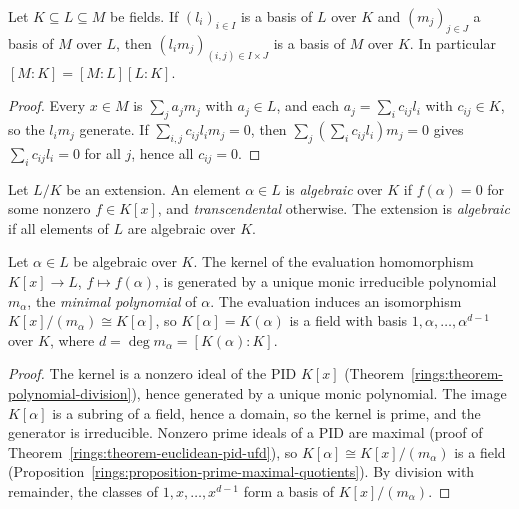 \begin{theorem}\label{fields:theorem-tower}
Let $K \subseteq L \subseteq M$ be fields. If $(l_i)_{i \in I}$ is a basis of $L$ over $K$ and $(m_j)_{j \in J}$ a
basis of $M$ over $L$, then $(l_i m_j)_{(i,j) \in I \times J}$ is a basis of $M$ over $K$. In
particular $[M : K] = [M : L][L : K]$.
\end{theorem}

\begin{proof}
Every $x \in M$ is $\sum_j a_j m_j$ with $a_j \in L$, and each $a_j = \sum_i c_{ij} l_i$ with
$c_{ij} \in K$, so the $l_i m_j$ generate. If $\sum_{i,j} c_{ij} l_i m_j = 0$, then
$\sum_j (\sum_i c_{ij} l_i) m_j = 0$ gives $\sum_i c_{ij} l_i = 0$ for all $j$, hence all $c_{ij} = 0$.
\end{proof}

\begin{definition}\label{fields:definition-algebraic}
Let $L/K$ be an extension. An element $\alpha \in L$ is \emph{algebraic} over $K$ if
$f(\alpha) = 0$ for some nonzero $f \in K[x]$, and \emph{transcendental} otherwise. The
extension is \emph{algebraic} if all elements of $L$ are algebraic over $K$.
\end{definition}

\begin{proposition}\label{fields:proposition-minimal-polynomial}
Let $\alpha \in L$ be algebraic over $K$. The kernel of the evaluation homomorphism
$K[x] \to L$, $f \mapsto f(\alpha)$, is generated by a unique monic irreducible polynomial
$m_\alpha$, the \emph{minimal polynomial} of $\alpha$. The evaluation induces an isomorphism
$K[x]/(m_\alpha) \cong K[\alpha]$, so $K[\alpha] = K(\alpha)$ is a field with basis
$1, \alpha, \ldots, \alpha^{d-1}$ over $K$, where $d = \deg m_\alpha = [K(\alpha) : K]$.
\end{proposition}

\begin{proof}
The kernel is a nonzero ideal of the PID $K[x]$
(Theorem~\ref{rings:theorem-polynomial-division}), hence generated by a unique monic
polynomial. The image $K[\alpha]$ is a subring of a field, hence a domain, so the kernel is
prime, and the generator is irreducible. Nonzero prime ideals of a PID are maximal
(proof of Theorem~\ref{rings:theorem-euclidean-pid-ufd}), so $K[\alpha] \cong K[x]/(m_\alpha)$ is a
field (Proposition~\ref{rings:proposition-prime-maximal-quotients}). By division with
remainder, the classes of $1, x, \ldots, x^{d-1}$ form a basis of $K[x]/(m_\alpha)$.
\end{proof}

